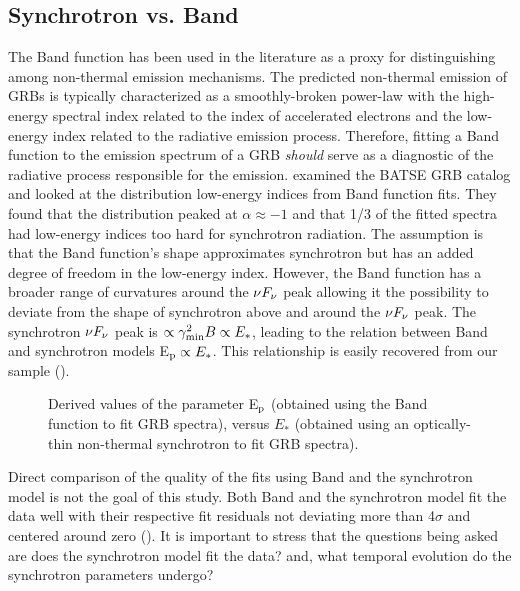 \subsection{Synchrotron vs. Band}
\label{sec:results:bvs}
The Band function has been used in the literature as a proxy for
distinguishing among non-thermal emission mechanisms. The predicted
non-thermal emission of GRBs is typically characterized as a
smoothly-broken power-law with the high-energy spectral index related
to the index of accelerated electrons and the low-energy index related
to the radiative emission process. Therefore, fitting a Band function
to the emission spectrum of a GRB {\em should} serve as a diagnostic
of the radiative process responsible for the
emission. \cite{preece:1998} examined the BATSE GRB catalog and
looked at the distribution low-energy indices from Band function
fits. They found that the distribution peaked at $\alpha\approx -1$
and that 1/3 of the fitted spectra had low-energy indices too hard for
synchrotron radiation. The assumption is that the Band function's
shape approximates synchrotron but has an added degree of freedom in
the low-energy index. However, the Band function has a broader range
of curvatures around the $\nu F_{\nu}$ peak allowing it the possibility to
deviate from the shape of synchrotron above and around the $\nu F_{\nu}$
peak. The synchrotron $\nu F_{\nu}$ peak is $\propto\gamma_{\rm min}^2 B\propto
E_*$, leading to the relation between Band and synchrotron models
E$_{\rm p}\propto E_*$. This relationship is easily recovered from our
sample (). 
\begin{figure}[h!]

  \centering


  \caption{Derived values of the parameter E$_{\rm p}$ (obtained using
    the Band function to fit GRB spectra), versus $E_*$ (obtained using
    an optically-thin non-thermal synchrotron to fit GRB spectra).}

  \label{fig:EpEc}

\end{figure}
Direct comparison of the quality of
the fits using Band and the synchrotron model is not the goal of this
study. Both Band and the synchrotron model fit the data well with
their respective fit residuals not deviating more than 4$\sigma$ and
centered around zero (). It is important to
stress that the questions being asked are does the synchrotron model
fit the data?  and, what temporal evolution do the synchrotron
parameters undergo?

